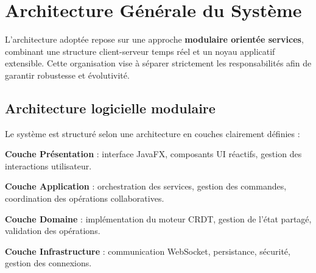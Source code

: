 \documentclass[a4paper,oneside,12pt]{book}
\begin{document}
\chapter{\textbf{Architecture Générale du Système}}

L’architecture adoptée repose sur une approche \textbf{modulaire orientée services}, combinant une structure client-serveur temps réel et un noyau applicatif extensible. Cette organisation vise à séparer strictement les responsabilités afin de garantir robustesse et évolutivité.

\section{\textbf{Architecture logicielle modulaire}}

Le système est structuré selon une architecture en couches clairement définies :

\textbf{Couche Présentation} : interface JavaFX, composants UI réactifs, gestion des interactions utilisateur.  

\textbf{Couche Application} : orchestration des services, gestion des commandes, coordination des opérations collaboratives.  

\textbf{Couche Domaine} : implémentation du moteur CRDT, gestion de l’état partagé, validation des opérations.  

\textbf{Couche Infrastructure} : communication WebSocket, persistance, sécurité, gestion des connexions.
\end{document}
